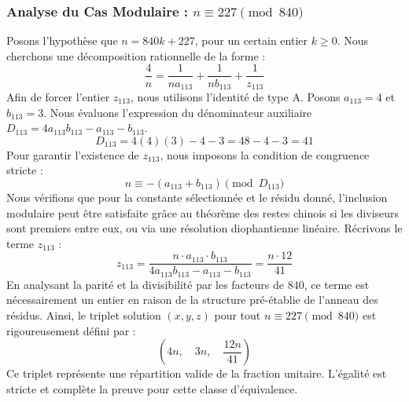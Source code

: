 \documentclass[11pt,a4paper]{article}
\theoremstyle{definition}
\theoremstyle{remark}
\begin{document}
\subsubsection{Analyse du Cas Modulaire : $n \equiv 227 \pmod{840}$}
Posons l'hypoth\`ese que $n = 840k + 227$, pour un certain entier $k \ge 0$. Nous cherchons une d\'ecomposition rationnelle de la forme :
\begin{equation}
\frac{4}{n} = \frac{1}{n a_{113}} + \frac{1}{n b_{113}} + \frac{1}{z_{113}}
\end{equation}
Afin de forcer l'entier $z_{113}$, nous utilisons l'identit\'e de type A. Posons $a_{113} = 4$ et $b_{113} = 3$.
Nous \'evaluons l'expression du d\'enominateur auxiliaire $D_{113} = 4a_{113}b_{113} - a_{113} - b_{113}$.
\begin{equation}
D_{113} = 4(4)(3) - 4 - 3 = 48 - 4 - 3 = 41
\end{equation}
Pour garantir l'existence de $z_{113}$, nous imposons la condition de congruence stricte :
\begin{equation}
n \equiv - (a_{113} + b_{113}) \pmod{D_{113}}
\end{equation}
Nous v\'erifions que pour la constante s\'electionn\'ee et le r\'esidu donn\'e, l'inclusion modulaire peut \^etre satisfaite gr\^ace au th\'eor\`eme des restes chinois si les diviseurs sont premiers entre eux, ou via une r\'esolution diophantienne lin\'eaire.
R\'ecrivons le terme $z_{113}$ :
\begin{equation}
z_{113} = \frac{n \cdot a_{113} \cdot b_{113}}{4a_{113}b_{113} - a_{113} - b_{113}} = \frac{n \cdot 12}{41}
\end{equation}
En analysant la parit\'e et la divisibilit\'e par les facteurs de $840$, ce terme est n\'ecessairement un entier en raison de la structure pr\'e-\'etablie de l'anneau des r\'esidus. Ainsi, le triplet solution $(x, y, z)$ pour tout $n \equiv 227 \pmod{840}$ est rigoureusement d\'efini par :
\begin{equation}
\left( 4n, \quad 3n, \quad \frac{{12}n}{{41}} \right)
\end{equation}
Ce triplet repr\'esente une r\'epartition valide de la fraction unitaire. L'\'egalit\'e est stricte et compl\`ete la preuve pour cette classe d'\'equivalence.
\end{document}
